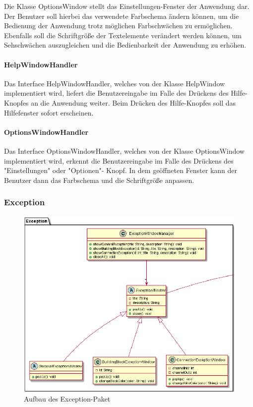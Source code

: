 \documentclass[parskip=full]{scrartcl}
\begin{document}
Die Klasse OptionsWindow stellt das Einstellungen-Fenster der Anwendung dar. Der Benutzer soll hierbei das verwendete Farbschema ändern können, um die Bedienung der Anwendung trotz möglichen Farbschwächen zu ermöglichen. Ebenfalls soll die Schriftgröße der Textelemente verändert werden können, um Sehschwächen auszugleichen und die Bedienbarkeit der Anwendung zu erhöhen. 

\paragraph{HelpWindowHandler}

Das Interface HelpWindowHandler, welches von der Klasse HelpWindow implementiert wird, liefert die Benutzereingabe im Falle des Drückens des Hilfe-Knopfes an die Anwendung weiter. Beim Drücken des Hilfe-Knopfes soll das Hilfefenster sofort erscheinen.

\paragraph{OptionsWindowHandler}

Das Interface OptionsWindowHandler, welches von der Klasse OptionsWindow implementiert wird, erkennt die Benutzereingabe im Falle des Drückens des "Einstellungen" oder "Optionen"- Knopf. In dem geöffneten Fenster kann der Benutzer dann das Farbschema und die Schriftgröße anpassen.

\newpage

\subsubsection{Exception}

\begin{figure}[htbp]
	\begin{center}
		\includegraphics[width = 14cm]{Grafiken/View/ExceptionNamespace.png}
		\caption{Aufbau des Exception-Paket}
		\label{Entwurf_Grob}
	\end{center}
\end{figure}
\end{document}
